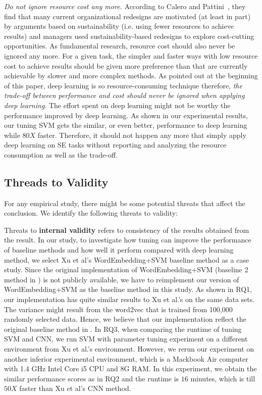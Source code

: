 \documentclass[sigconf,review, anonymous]{acmart}
\theoremstyle{break}
\begin{document}
{\it Do not ignore resource cost any more.} According to Calero and Pattini~\cite{calero2015green}, they find that many current organizational redesigns are motivated (at least in part) by arguments based on sustainability (i.e. using fewer resources to achieve results) and managers used sustainability-based redesigns to explore cost-cutting opportunities. As fundamental research, resource cost should also never be ignored any more.
For a given task, the simpler and faster ways with low resource cost
to achieve results should be given more preference than that 
are currently achievable by slower and more complex methods. As pointed out
at the beginning of this paper, deep learning is so resource-consuming technique
 therefore, {\it the  trade-off between performance and cost should never
be ignored when applying deep learning}. The effort spent on deep learning might not be worthy the performance
improved by deep learning. As shown in our experimental results, our tuning SVM gets the similar,
 or even better, performance to deep learning while $80X$ faster.
Therefore, it should not happen any more that simply apply deep learning on SE tasks
without reporting and analyzing the resource consumption as well as the trade-off.  
 


 
\subsection{Threads to Validity}
For any empirical study, there might be some potential threats that
affect the conclusion. We identify the following threats to validity:

Threats to \textbf{internal validity} refers to consistency of the results 
obtained from the result. In our study,  to investigate how
tuning can improve the performance of baseline methods and how well
it perform compared with deep learning method, we select
Xu et al's  WordEmbedding+SVM baseline method as a case study. Since the original implementation of 
WordEmbedding+SVM (baseline 2 method in \cite{xu2016predicting}) is not 
publicly available, we have to reimplement our version of WordEmbedding+SVM as
the baseline method in this study. As shown in RQ1, our implementation has
quite similar results to Xu et al.'s on the same data sets. The variance might 
result from the word2vec that is trained from 100,000 randomly selected data.
Hence, we believe that our implementation reflect the original
 baseline method in \cite{xu2016predicting}. In RQ3, when comparing the runtime of tuning
 SVM and CNN, we run SVM with parameter tuning experiment on a different environment
 from Xu et al.'s environment. However, we rerun our experiment on another
 inferior experimental environment, which is a Mackbook Air computer 
 with 1.4 GHz Intel Core i5 CPU and 8G RAM. In this experiment, we obtain
 the similar performance scores as in RQ2 and the runtime is $16$ minutes,
 which is till $50X$ faster than Xu et al's CNN method.
 
\end{document}
